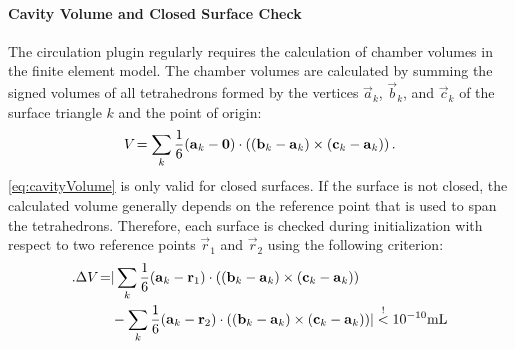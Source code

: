 \paragraph{Cavity Volume and Closed Surface Check} The circulation plugin regularly requires the calculation of chamber volumes in the finite element model.
The chamber volumes are calculated by summing the signed volumes of all tetrahedrons formed by the vertices $\vec a_k$, $\vec b_k$, and $\vec c_k$ of the surface triangle $k$ and the point of origin:
\begin{equation}
    \vol{} = \sum_k \frac{1}{6} (\vec a_k - \vec 0) \cdot ((\vec b_k - \vec a_k) \times (\vec c_k - \vec a_k)) \,. \label{eq:cavityVolume}
\end{equation}
\autoref{eq:cavityVolume} is only valid for closed surfaces.
If the surface is not closed, the calculated volume generally depends on the reference point that is used to span the tetrahedrons.
Therefore, each surface is checked during initialization with respect to two reference points $\vec r_1$ and $\vec r_2$ using the following criterion:
\begin{align}
    .\Delta \vol{} =& |
        \sum_k \frac{1}{6} (\vec a_k - \vec r_1) \cdot ((\vec b_k - \vec a_k) \times (\vec c_k - \vec a_k)) \\
        & -\sum_k \frac{1}{6} (\vec a_k - \vec r_2) \cdot ((\vec b_k - \vec a_k) \times (\vec c_k - \vec a_k)) |
        \overset{!}{<} 10^{-10} \si{mL}
\end{align}

